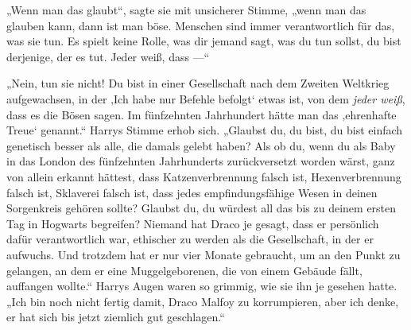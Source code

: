 „Wenn man das glaubt“, sagte sie mit unsicherer Stimme, „wenn man das glauben kann, dann ist man böse. Menschen sind immer verantwortlich für das, was sie tun. Es spielt keine Rolle, was dir jemand sagt, was du tun sollst, du bist derjenige, der es tut. Jeder weiß, dass —“

„Nein, tun sie nicht! Du bist in einer Gesellschaft nach dem Zweiten Weltkrieg aufgewachsen, in der ‚Ich habe nur Befehle befolgt‘ etwas ist, von dem \emph{jeder weiß}, dass es die Bösen sagen. Im fünfzehnten Jahrhundert hätte man das ‚ehrenhafte Treue‘ genannt.“
Harrys Stimme erhob sich.
„Glaubst du, du bist, du bist einfach genetisch besser als alle, die damals gelebt haben? Als ob du, wenn du als Baby in das London des fünfzehnten Jahrhunderts zurückversetzt worden wärst, ganz von allein erkannt hättest, dass Katzenverbrennung falsch ist, Hexenverbrennung falsch ist, Sklaverei falsch ist, dass jedes empfindungsfähige Wesen in deinen Sorgenkreis gehören sollte? Glaubst du, du würdest all das bis zu deinem ersten Tag in Hogwarts begreifen? Niemand hat Draco je gesagt, dass er persönlich dafür verantwortlich war, ethischer zu werden als die Gesellschaft, in der er aufwuchs. Und trotzdem hat er nur vier Monate gebraucht, um an den Punkt zu gelangen, an dem er eine Muggelgeborenen, die von einem Gebäude fällt, auffangen wollte.“
Harrys Augen waren so grimmig, wie sie ihn je gesehen hatte.
„Ich bin noch nicht fertig damit, Draco Malfoy zu korrumpieren, aber ich denke, er hat sich bis jetzt ziemlich gut geschlagen.“

